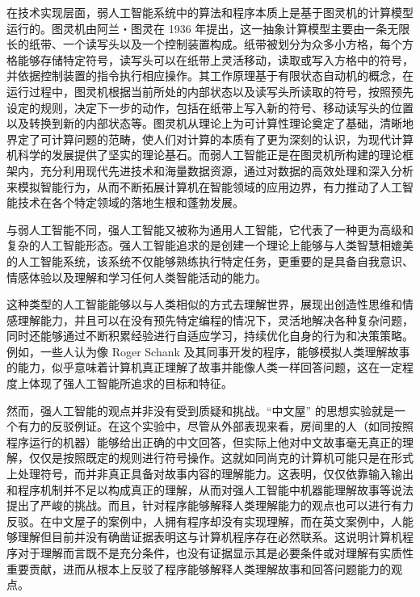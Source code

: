 在技术实现层面，弱人工智能系统中的算法和程序本质上是基于图灵机的计算模型运行的。图灵机由阿兰・图灵在 1936 年提出，这一抽象计算模型主要由一条无限长的纸带、一个读写头以及一个控制装置构成。纸带被划分为众多小方格，每个方格能够存储特定符号，读写头可以在纸带上灵活移动，读取或写入方格中的符号，并依据控制装置的指令执行相应操作。其工作原理基于有限状态自动机的概念，在运行过程中，图灵机根据当前所处的内部状态以及读写头所读取的符号，按照预先设定的规则，决定下一步的动作，包括在纸带上写入新的符号、移动读写头的位置以及转换到新的内部状态等。图灵机从理论上为可计算性理论奠定了基础，清晰地界定了可计算问题的范畴，使人们对计算的本质有了更为深刻的认识，为现代计算机科学的发展提供了坚实的理论基石。而弱人工智能正是在图灵机所构建的理论框架内，充分利用现代先进技术和海量数据资源，通过对数据的高效处理和深入分析来模拟智能行为，从而不断拓展计算机在智能领域的应用边界，有力推动了人工智能技术在各个特定领域的落地生根和蓬勃发展。





与弱人工智能不同，强人工智能又被称为通用人工智能，它代表了一种更为高级和复杂的人工智能形态。强人工智能追求的是创建一个理论上能够与人类智慧相媲美的人工智能系统，该系统不仅能够熟练执行特定任务，更重要的是具备自我意识、情感体验以及理解和学习任何人类智能活动的能力。


这种类型的人工智能能够以与人类相似的方式去理解世界，展现出创造性思维和情感理解能力，并且可以在没有预先特定编程的情况下，灵活地解决各种复杂问题，同时还能够通过不断积累经验进行自适应学习，持续优化自身的行为和决策策略。例如，一些人认为像 Roger Schank 及其同事开发的程序，能够模拟人类理解故事的能力，似乎意味着计算机真正理解了故事并能像人类一样回答问题，这在一定程度上体现了强人工智能所追求的目标和特征。


然而，强人工智能的观点并非没有受到质疑和挑战。“中文屋” 的思想实验就是一个有力的反驳例证。在这个实验中，尽管从外部表现来看，房间里的人（如同按照程序运行的机器）能够给出正确的中文回答，但实际上他对中文故事毫无真正的理解，仅仅是按照既定的规则进行符号操作。这就如同尚克的计算机可能只是在形式上处理符号，而并非真正具备对故事内容的理解能力。这表明，仅仅依靠输入输出和程序机制并不足以构成真正的理解，从而对强人工智能中机器能理解故事等说法提出了严峻的挑战。而且，针对程序能够解释人类理解能力的观点也可以进行有力反驳。在中文屋子的案例中，人拥有程序却没有实现理解，而在英文案例中，人能够理解但目前并没有确凿证据表明这与计算机程序存在必然联系。这说明计算机程序对于理解而言既不是充分条件，也没有证据显示其是必要条件或对理解有实质性重要贡献，进而从根本上反驳了程序能够解释人类理解故事和回答问题能力的观点。





